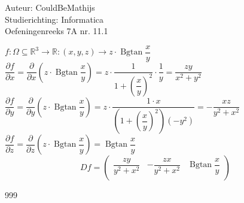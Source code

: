 \documentclass[a4paper]{article}
\newcommand{\Bgtan}{\operatorname{Bgtan}}
\newcommand{\pafg}[2][]{\dfrac{\partial #1}{\partial #2}}
\begin{document}
  
\noindent \large Auteur: CouldBeMathijs \\
\noindent \large Studierichting: Informatica\\
\noindent \large Oefeningenreeks 7A nr. 11.1\\

\medskip

\normalsize

$ f: \Omega \subseteq \mathbb{R}^3 \rightarrow \mathbb{R}: (x,y,z) \rightarrow z \cdot\Bgtan\dfrac{x}{y}$\\

$ \pafg[f]{x} = \pafg{x} \left(z \cdot \Bgtan \dfrac{x}{y}\right) = z \cdot \dfrac{1}{1+\left(\dfrac{x}{y}\right)^2} \cdot \dfrac{1}{y} = \dfrac{zy}{x^2+y^2}$\\

$ \pafg[f]{y} = \pafg{y} \left(z \cdot \Bgtan \dfrac{x}{y}\right) = z \cdot \dfrac{1 \cdot x}{\left(1+\left(\dfrac{x}{y}\right)^2\right)(-y^2)} = - \dfrac{xz}{y^2 + x^2}$\\

$ \pafg[f]{z} = \pafg{z} \left(z \cdot \Bgtan \dfrac{x}{y}\right) = \Bgtan\dfrac{x}{y}$\\

$$Df = \left (
\begin{array}{ccc}
        \dfrac{zy}{y^2 + x^2} & -\dfrac{zx}{y^2 + x^2} & \operatorname{Bgtan}\dfrac{x}{y}\\
\end{array}
\right )$$

\begin{thebibliography}{999}
\end{thebibliography}
\end{document}
